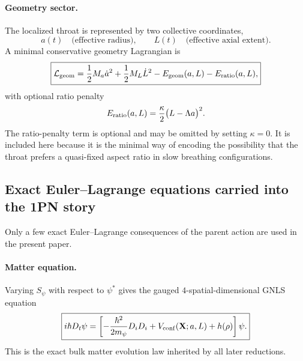 \documentclass[11pt]{article}
\begin{document}
\paragraph{Geometry sector.}
The localized throat is represented by two collective coordinates,
\begin{equation}
a(t)\quad \text{(effective radius)},
\qquad
L(t)\quad \text{(effective axial extent)}.
\label{eq:app-a-L}
\end{equation}
A minimal conservative geometry Lagrangian is
\begin{equation}
\boxed{
\mathcal L_{\rm geom}
=
\frac12 M_a \dot a^2
+
\frac12 M_L \dot L^2
-
E_{\rm geom}(a,L)
-
E_{\rm ratio}(a,L),
}
\label{eq:app-Lgeom}
\end{equation}
with optional ratio penalty
\begin{equation}
E_{\rm ratio}(a,L)
=
\frac{\kappa}{2}\bigl(L-\Lambda a\bigr)^2.
\label{eq:app-Eratio}
\end{equation}
The ratio-penalty term is optional and may be omitted by setting \(\kappa=0\). It is
included here because it is the minimal way of encoding the possibility that the throat
prefers a quasi-fixed aspect ratio in slow breathing configurations.

\subsection{Exact Euler--Lagrange equations carried into the 1PN story}
\label{app:variational-eom}

Only a few exact Euler--Lagrange consequences of the parent action are used in the present
paper.

\paragraph{Matter equation.}
Varying \(S_\psi\) with respect to \(\psi^*\) gives the gauged \(4\)-spatial-dimensional
GNLS equation
\begin{equation}
\boxed{
i\hbar D_t\psi
=
\left[
-\frac{\hbar^2}{2m_\psi}D_iD_i
+
V_{\rm conf}(\mathbf X;a,L)
+
h(\rho)
\right]\psi.
}
\label{eq:app-gnls}
\end{equation}
This is the exact bulk matter evolution law inherited by all later reductions.
\end{document}
